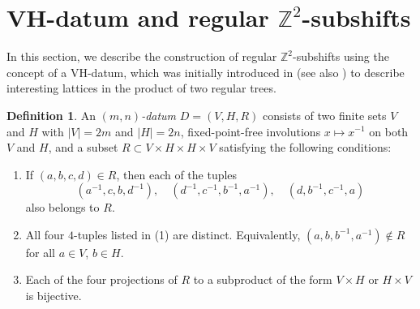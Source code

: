 \documentclass[12pt]{article}
\theoremstyle{definition}
\newtheorem{definition}{Definition}
\begin{document}
\section{VH-datum and regular $\mathbb{Z}^2$-subshifts}\label{sect:VHdatum}

In this section, we describe the construction of regular $\mathbb{Z}^2$-subshifts using the concept of a VH-datum, which was initially introduced in \cite{BurgerMozes:Lattices} (see also \cite{KimberleyRobertson2002}) to describe interesting lattices in the product of two regular trees.

\begin{definition}
An \textit{$(m,n)$-datum} $D=(V,H,R)$ consists of two finite sets $V$ and $H$ with $|V|=2m$ and $|H|=2n$, fixed-point-free involutions $x\mapsto x^{-1}$ on both $V$ and $H$, and a subset $R \subset V \times H \times H \times V$ satisfying the following conditions:
\begin{enumerate}
  \item[(1)] If $(a,b,c,d) \in R$, then each of the tuples
  \[
  (a^{-1},c,b,d^{-1}), \quad (d^{-1},c^{-1},b^{-1},a^{-1}), \quad (d,b^{-1},c^{-1},a)
  \]
  also belongs to $R$.
  \item[(2)] All four $4$-tuples listed in (1) are distinct. Equivalently, $(a,b,b^{-1},a^{-1}) \not\in R$ for all $a \in V$, $b \in H$.
  \item[(3)] Each of the four projections of $R$ to a subproduct of the form $V \times H$ or $H \times V$ is bijective.
\end{enumerate}
\end{definition}
\end{document}
